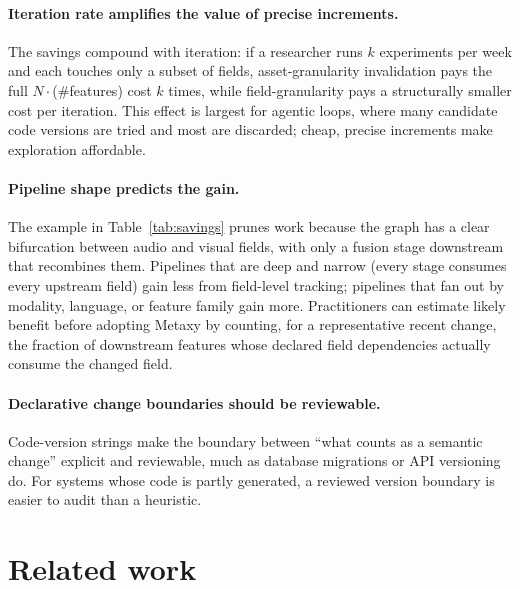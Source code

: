 \documentclass[sigconf]{acmart}
\begin{document}
\paragraph{Iteration rate amplifies the value of precise increments.}
The savings compound with iteration: if a researcher runs $k$ experiments per week and each touches only a subset of fields, asset-granularity invalidation pays the full $N \cdot$(\#features) cost $k$ times, while field-granularity pays a structurally smaller cost per iteration.
This effect is largest for agentic loops, where many candidate code versions are tried and most are discarded; cheap, precise increments make exploration affordable.

\paragraph{Pipeline shape predicts the gain.}
The example in Table~\ref{tab:savings} prunes work because the graph has a clear bifurcation between audio and visual fields, with only a fusion stage downstream that recombines them.
Pipelines that are deep and narrow (every stage consumes every upstream field) gain less from field-level tracking; pipelines that fan out by modality, language, or feature family gain more.
Practitioners can estimate likely benefit before adopting Metaxy by counting, for a representative recent change, the fraction of downstream features whose declared field dependencies actually consume the changed field.

\paragraph{Declarative change boundaries should be reviewable.}
Code-version strings make the boundary between ``what counts as a semantic change'' explicit and reviewable, much as database migrations or API versioning do.
For systems whose code is partly generated, a reviewed version boundary is easier to audit than a heuristic.

\section{Related work}
\end{document}
